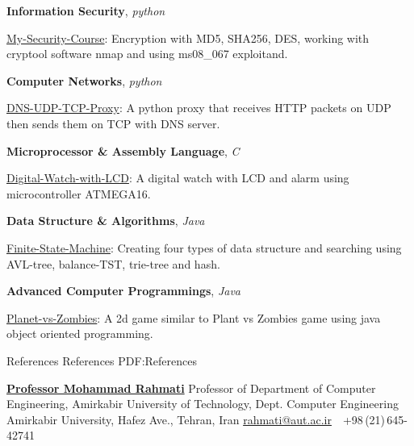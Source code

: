 \documentclass[letterpaper,MMMyyyy,nonstopmode]{resume}
\begin{document}
\begin{Body}
\BigGap
\BulletItem
\textbf{Information Security},
\textit{\small{python}}
\begin{Detail}
\SubBulletItem
\href{https://github.com/aliyazdi75/My-Security-Course}
{My-Security-Course}:
Encryption with MD5, SHA256, DES,
working with cryptool software nmap
and using ms08\_067 exploitand.
\end{Detail}

\BigGap
\BulletItem
\textbf{Computer Networks},
\textit{\small{python}}
\begin{Detail}
\SubBulletItem
\href{https://github.com/aliyazdi75/DNS-UDP-TCP-Proxy}
{DNS-UDP-TCP-Proxy}:
A python proxy that receives HTTP packets on UDP
then sends them on TCP with DNS server.
\end{Detail}


\BigGap
\BulletItem
\textbf{Microprocessor \& Assembly Language},
\textit{\small{C}}
\begin{Detail}
\SubBulletItem
\href{https://github.com/aliyazdi75/Digital-Watch-with-LCD}
{Digital-Watch-with-LCD}:
A digital watch with LCD and
alarm using microcontroller ATMEGA16.
\end{Detail}

\BigGap
\BulletItem
\textbf{Data Structure \& Algorithms},
\textit{\small{Java}}
\begin{Detail}
\SubBulletItem
\href{https://github.com/aliyazdi75/Finite-State-Machine}
{Finite-State-Machine}:
Creating four types of data structure and searching using
AVL-tree, balance-TST, trie-tree and hash.
\end{Detail}

\BigGap
\BulletItem
\textbf{Advanced Computer Programmings},
\textit{\small{Java}}
\begin{Detail}
\SubBulletItem
\href{https://github.com/aliyazdi75/Planet\_vs\_Zombies}
{Planet-vs-Zombies}:
A 2d game similar to Plant vs Zombies game
using java object oriented programming.
\end{Detail}



\Section
{References}
{References}
{PDF:References}

\BulletItem
\href{https://aut.ac.ir/cv/2416/Mohammad-Rahmati?slc_lang=en&&cv=2416&mod=scv}
{\textbf{Professor Mohammad Rahmati}}
\newline
Professor of Department of Computer Engineering, Amirkabir University of Technology,
\newline
Dept. Computer Engineering Amirkabir University, Hafez Ave., Tehran, Iran
\newline
\href{mailto:rahmatiaut.ac.ir}
{rahmati@aut.ac.ir}
\,\SubBulletSymbol\,
+98\,(21)\,645-42741


\end{Body}
\end{document}
